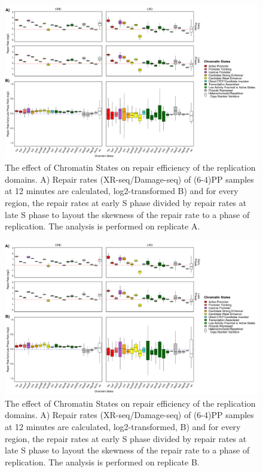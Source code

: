 \begin{figure}[H]
\begin{center}
\includegraphics[width=\textwidth]{Chapters/7_appendix/figures/supfig13}
\caption[The effect of Chromatin States on repair efficiency of the replication domains for (6-4)PP samples at 12 minutes (replicate A).]{The effect of Chromatin States on repair efficiency of the replication domains. A) Repair rates (XR-seq/Damage-seq) of (6-4)PP samples at 12 minutes are calculated, log2-transformed B) and for every region, the repair rates at early S phase divided by repair rates at late S phase to layout the skewness of the repair rate to a phase of replication. The analysis is performed on replicate A.}
\label{supfig:chromatin1}
\end{center}
\end{figure}

\begin{figure}[H]
\begin{center}
\includegraphics[width=\textwidth]{Chapters/7_appendix/figures/supfig14}
\caption[The effect of Chromatin States on repair efficiency of the replication domains for (6-4)PP samples at 12 minutes (replicate B).]{The effect of Chromatin States on repair efficiency of the replication domains. A) Repair rates (XR-seq/Damage-seq) of (6-4)PP samples at 12 minutes are calculated, log2-transformed, B) and for every region, the repair rates at early S phase divided by repair rates at late S phase to layout the skewness of the repair rate to a phase of replication. The analysis is performed on replicate B.}
\label{supfig:chromatin2}
\end{center}
\end{figure}

